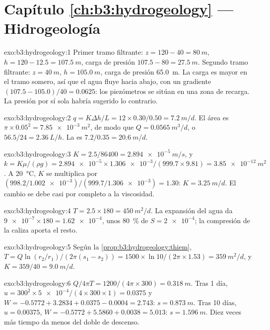 \section*{Capítulo \ref{ch:b3:hydrogeology} --- Hidrogeología}

\begin{solution}{exo:b3:hydrogeology:1}
Primer tramo filtrante: $z = 120 - 40 = \qty{80}{m}$, $h = 120 - 12.5 =
\qty{107.5}{m}$, carga de presión $107.5 - 80 = \qty{27.5}{m}$. Segundo
tramo filtrante: $z = \qty{40}{m}$, $h = \qty{105.0}{m}$, carga de presión
\qty{65.0}{m}. La carga es mayor en el tramo somero, así que el agua
fluye hacia abajo, con un gradiente $(107.5 - 105.0)/40 = \num{0.0625}$:
los piezómetros se sitúan en una zona de recarga. La presión por sí sola habría
sugerido lo contrario.
\end{solution}

\begin{solution}{exo:b3:hydrogeology:2}
$q = K\Delta h/L = 12\times0.30/0.50 = \qty{7.2}{m/d}$. El área es
$\pi\times0.05^2 = \qty{7.85e-3}{m^2}$, de modo que $Q = \qty{0.0565}{m^3/d}$, o
$56.5/24 = \qty{2.36}{L/h}$. La  es $7.2/0.35 =
\qty{20.6}{m/d}$.
\end{solution}

\begin{solution}{exo:b3:hydrogeology:3}
$K = 2.5/86400 = \qty{2.894e-5}{m/s}$, y $k = K\mu/(\rho g) =
\num{2.894e-5}\times\num{1.306e-3}/(999.7\times9.81) =
\qty{3.85e-12}{m^2}$. A \qty{20}{\celsius}, $K$ se multiplica por
$(998.2/\num{1.002e-3})/(999.7/\num{1.306e-3}) = \num{1.30}$: $K =
\qty{3.25}{m/d}$. El cambio se debe casi por completo a la viscosidad.
\end{solution}

\begin{solution}{exo:b3:hydrogeology:4}
$T = 2.5\times180 = \qty{450}{m^2/d}$. La expansión del agua da
$\num{9e-7}\times180 = \num{1.62e-4}$, unos \qty{80}{\percent} de $S =
\num{2e-4}$; la compresión de la caliza aporta el resto.
\end{solution}

\begin{solution}{exo:b3:hydrogeology:5}
Según la \cref{prop:b3:hydrogeology:thiem}, $T = Q\ln(r_2/r_1)/(2\pi(s_1 -
s_2)) = 1500\times\ln10/(2\pi\times1.53) = \qty{359}{m^2/d}$, y $K =
359/40 = \qty{9.0}{m/d}$.
\end{solution}

\begin{solution}{exo:b3:hydrogeology:6}
$Q/4\pi T = 1200/(4\pi\times300) = \qty{0.318}{m}$. Tras 1 día, $u =
300^2\times\num{5e-4}/(4\times300\times1) = \num{0.0375}$ y $W = -0.5772
+ 3.2834 + 0.0375 - 0.0004 = \num{2.743}$: $s = \qty{0.873}{m}$. Tras 10
días, $u = \num{0.00375}$, $W = -0.5772 + 5.5860 + 0.0038 = \num{5.013}$:
$s = \qty{1.596}{m}$. Diez veces más tiempo da menos del doble de
descenso.
\end{solution}

